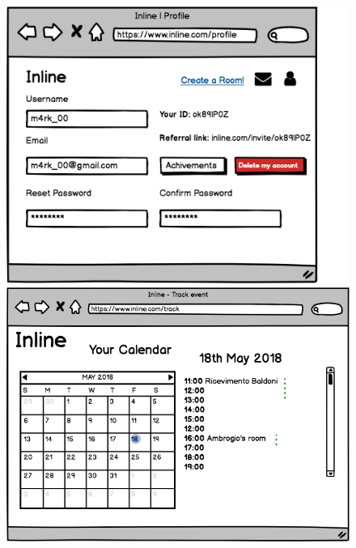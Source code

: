 	\begin{figure}[H]
		\centering
		\begin{minipage}[b]{0.45\textwidth}
			\includegraphics[width=\textwidth]{./Mockup/profile.png}
		\end{minipage}
		\hfill
		\begin{minipage}[b]{0.45\textwidth}
			\includegraphics[width=\textwidth]{./Mockup/track.png}
		\end{minipage}
	\end{figure}

